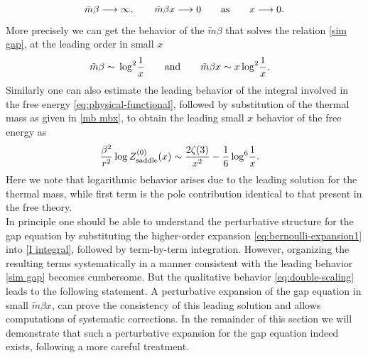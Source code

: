 \documentclass[a4paper,11pt]{article}
\newcommand{\Order}{\mathcal O}
\begin{document}
\begin{equation}
 \tilde m\beta\longrightarrow\infty,
 \qquad
 \tilde m\beta x\longrightarrow0\qquad{\rm as }\qquad x\longrightarrow 0.
 \label{eq:double-scaling}
\end{equation}
More precisely we can get the behavior of the $\tilde m\beta $ that solves the relation \eqref{sim gap}, at the leading order in small $x$
\begin{align}\label{mb mbx}
\tilde m\beta\sim{}&\log^2\!\frac1x \qquad {\rm and } \qquad\tilde m \beta x\sim x \log^2\!\frac1x .
\end{align}
Similarly one can also estimate the leading behavior of the integral involved in the free energy  \eqref{eq:physical-functional}, followed by substitution of the thermal mass as given in \eqref{mb mbx}, to obtain the leading small $x$ behavior of the free energy as  
\begin{align}
	 \frac{\beta^2}{r^2}\log Z_{\rm saddle}^{(0)}(x)
	\sim{}&\frac{2\zeta(3)}{x^2}
	-\frac16\log^6\!\frac1x .
\end{align}
Here we note that logarithmic behavior arises due to the leading solution for the thermal mass, while first term is the pole contribution identical to that present in the free theory.
\\

In principle one should be able to understand the perturbative structure for the gap equation by 
substituting the higher-order expansion \eqref{eq:bernoulli-expansion1} into \eqref{I integral}, followed by term-by-term integration. However, organizing the resulting terms systematically in a manner consistent with the leading behavior \eqref{sim gap} becomes cumbersome.
But the qualitative behavior \eqref{eq:double-scaling} leads to the following statement. A perturbative expansion of the gap equation in small $\tilde m \beta x$, can prove the consistency of  this leading solution and allows computations of systematic corrections. In the remainder of this section we will demonstrate that  such a perturbative expansion for the gap equation indeed exists, following a more careful treatment.
\\
\end{document}
